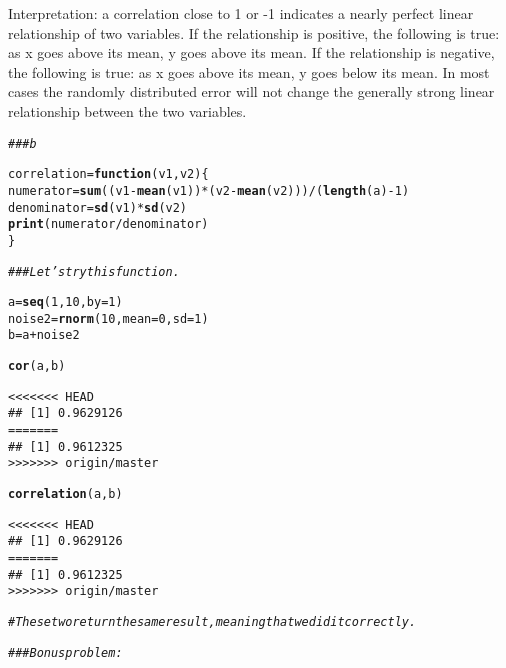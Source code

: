 \documentclass[12pt,letter]{article}\usepackage[]{graphicx}\usepackage[]{color}
\makeatletter
\newcommand{\hlnum}[1]{\textcolor[rgb]{0.686,0.059,0.569}{#1}}%
\newcommand{\hlcom}[1]{\textcolor[rgb]{0.678,0.584,0.686}{\textit{#1}}}%
\newcommand{\hlopt}[1]{\textcolor[rgb]{0,0,0}{#1}}%
\newcommand{\hlstd}[1]{\textcolor[rgb]{0.345,0.345,0.345}{#1}}%
\newcommand{\hlkwa}[1]{\textcolor[rgb]{0.161,0.373,0.58}{\textbf{#1}}}%
\newcommand{\hlkwb}[1]{\textcolor[rgb]{0.69,0.353,0.396}{#1}}%
\newcommand{\hlkwc}[1]{\textcolor[rgb]{0.333,0.667,0.333}{#1}}%
\newcommand{\hlkwd}[1]{\textcolor[rgb]{0.737,0.353,0.396}{\textbf{#1}}}%
\newenvironment{kframe}{%
 \def\at@end@of@kframe{}%
 \ifinner\ifhmode%
  \def\at@end@of@kframe{\end{minipage}}%
  \begin{minipage}{\columnwidth}%
 \fi\fi%
 \def\FrameCommand##1{\hskip\@totalleftmargin \hskip-\fboxsep
 \colorbox{shadecolor}{##1}\hskip-\fboxsep
     \hskip-\linewidth \hskip-\@totalleftmargin \hskip\columnwidth}%
 \MakeFramed {\advance\hsize-\width
   \@totalleftmargin\z@ \linewidth\hsize
   \@setminipage}}%
 {\par\unskip\endMakeFramed%
 \at@end@of@kframe}
\newenvironment{knitrout}{}{} %
\makeatother
\begin{document}
Interpretation: a correlation close to 1 or -1 indicates a nearly perfect linear relationship of two variables. If the relationship is positive, the following is true: as x goes above its mean, y goes above its mean. If the relationship is negative, the following is true: as x goes above its mean, y goes below its mean. In most cases the randomly distributed error will not change the generally strong linear relationship between the two variables.

\begin{knitrout}
\color{fgcolor}\begin{kframe}
\begin{alltt}
\hlcom{### b}

\hlstd{correlation} \hlkwb{=} \hlkwa{function}\hlstd{(}\hlkwc{v1}\hlstd{,} \hlkwc{v2}\hlstd{) \{}
    \hlstd{numerator} \hlkwb{=} \hlkwd{sum}\hlstd{((v1} \hlopt{-} \hlkwd{mean}\hlstd{(v1))} \hlopt{*} \hlstd{(v2} \hlopt{-} \hlkwd{mean}\hlstd{(v2)))}\hlopt{/}\hlstd{(}\hlkwd{length}\hlstd{(a)} \hlopt{-} \hlnum{1}\hlstd{)}
    \hlstd{denominator} \hlkwb{=} \hlkwd{sd}\hlstd{(v1)} \hlopt{*} \hlkwd{sd}\hlstd{(v2)}
    \hlkwd{print}\hlstd{(numerator}\hlopt{/}\hlstd{denominator)}
\hlstd{\}}

\hlcom{### Let's try this function.}

\hlstd{a} \hlkwb{=} \hlkwd{seq}\hlstd{(}\hlnum{1}\hlstd{,} \hlnum{10}\hlstd{,} \hlkwc{by} \hlstd{=} \hlnum{1}\hlstd{)}
\hlstd{noise2} \hlkwb{=} \hlkwd{rnorm}\hlstd{(}\hlnum{10}\hlstd{,} \hlkwc{mean} \hlstd{=} \hlnum{0}\hlstd{,} \hlkwc{sd} \hlstd{=} \hlnum{1}\hlstd{)}
\hlstd{b} \hlkwb{=} \hlstd{a} \hlopt{+} \hlstd{noise2}

\hlkwd{cor}\hlstd{(a, b)}
\end{alltt}
\begin{verbatim}
<<<<<<< HEAD
## [1] 0.9629126
=======
## [1] 0.9612325
>>>>>>> origin/master
\end{verbatim}
\begin{alltt}
\hlkwd{correlation}\hlstd{(a, b)}
\end{alltt}
\begin{verbatim}
<<<<<<< HEAD
## [1] 0.9629126
=======
## [1] 0.9612325
>>>>>>> origin/master
\end{verbatim}
\begin{alltt}
\hlcom{# These two return the same result, meaning that we did it correctly.}

\hlcom{### Bonus problem:}


\end{alltt}
\end{kframe}
\end{knitrout}
\end{document}
